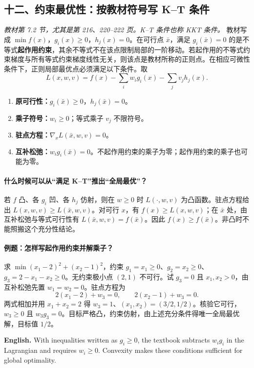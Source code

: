 \documentclass[UTF8,11pt,a4paper]{ctexart}
\newcommand{\EN}[1]{\par\noindent \textbf{English.} #1\par}
\begin{document}
\clearpage
\subsection*{十二、约束最优性：按教材符号写 K--T 条件}
\noindent\textit{教材第 7.2 节，尤其是第 216、220--222 页。K--T 条件也称 KKT 条件。}
教材写成 $\min f(x)$，$g_i(x)\ge0$，$h_j(x)=0$。在可行点 $\bar x$，满足 $g_i(\bar x)=0$ 的是不等式\textbf{起作用约束}，其余不等式不在该点限制局部的一阶移动。若起作用的不等式约束梯度与所有等式约束梯度线性无关，则该点是教材所称的正则点。在相应可微性条件下，正则局部最优点必须满足以下条件。取
\[
 L(x,w,v)=f(x)-\sum_i w_i g_i(x)-\sum_j v_j h_j(x).
\]
\begin{enumerate}
\item \textbf{原可行性：}$g_i(\bar x)\ge0$，$h_j(\bar x)=0$。
\item \textbf{乘子符号：}$w_i\ge0$；等式乘子 $v_j$ 不限符号。
\item \textbf{驻点方程：}$\nabla_x L(\bar x,w,v)=0$。
\item \textbf{互补松弛：}$w_i g_i(\bar x)=0$。不起作用约束的乘子为零；起作用约束的乘子也可能为零。
\end{enumerate}

\paragraph{什么时候可以从“满足 K--T”推出“全局最优”？}
若 $f$ 凸、各 $g_i$ 凹、各 $h_j$ 仿射，则在 $w\ge0$ 时 $L(\cdot,w,v)$ 为凸函数。驻点方程给出 $L(x,w,v)\ge L(\bar x,w,v)$。对可行 $x$，有 $f(x)\ge L(x,w,v)$；在 $\bar x$ 处，由互补松弛与等式可行性有 $L(\bar x,w,v)=f(\bar x)$。因此 $f(x)\ge f(\bar x)$。非凸时不能照搬这个充分性结论。

\paragraph{例题：怎样写起作用约束并解乘子？}
求 $\min (x_1-2)^2+(x_2-1)^2$，约束 $g_1=x_1\ge0$、$g_2=x_2\ge0$、$g_3=2-x_1-x_2\ge0$。无约束极小点 $(2,1)$ 不可行。试 $g_3=0$ 且 $x_1,x_2>0$，由互补松弛先置 $w_1=w_2=0$。驻点方程为
\[
2(x_1-2)+w_3=0,\qquad 2(x_2-1)+w_3=0.
\]
两式相加并用 $x_1+x_2=2$ 得 $w_3=1$、$(x_1,x_2)=(3/2,1/2)$。核验它可行，$w_3\ge0$ 且 $w_3g_3=0$。目标严格凸，约束仿射，由上述充分条件得唯一全局最优解，目标值 $1/2$。
\EN{With inequalities written as $g_i\ge0$, the textbook subtracts $w_i g_i$ in the Lagrangian and requires $w_i\ge0$. Convexity makes these conditions sufficient for global optimality.}
\end{document}
